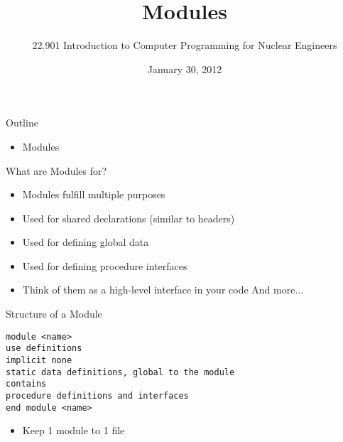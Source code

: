 \documentclass{beamer}
\title[]{Modules}
\author[]{22.901 Introduction to Computer Programming for Nuclear Engineers}
\institute[\insertpagenumber]{}
\date{January 30, 2012}
\begin{document}

\frame{\titlepage}

\begin{frame}{Outline}
  \begin{itemize}
    \item Modules
  \end{itemize}
\end{frame}
\begin{frame}{What are Modules for?}

  \begin{itemize}
    \item Modules fulfill multiple purposes
    \vfill\item Used for shared declarations (similar to headers)
    \vfill\item Used for defining global data
    \vfill\item Used for defining procedure interfaces
    \vfill\item Think of them as a high-level interface in your code
    \vfill
And more...
  \end{itemize}

\end{frame}
\begin{frame}{Structure of a Module}

\texttt{module <name>} \\
  \hspace{0.1cm} \texttt{use definitions} \\
  \hspace{0.1cm} \texttt{implicit none} \\
  \hspace{0.1cm} \texttt{static data definitions, global to the module} \\
\texttt{contains} \\
  \hspace{0.1cm} \texttt{procedure definitions and interfaces} \\
\texttt{end module <name>}
  \vfill
  \begin{itemize}
    \item Keep 1 module to 1 file 
  \end{itemize}

\end{frame}
\end{document}

